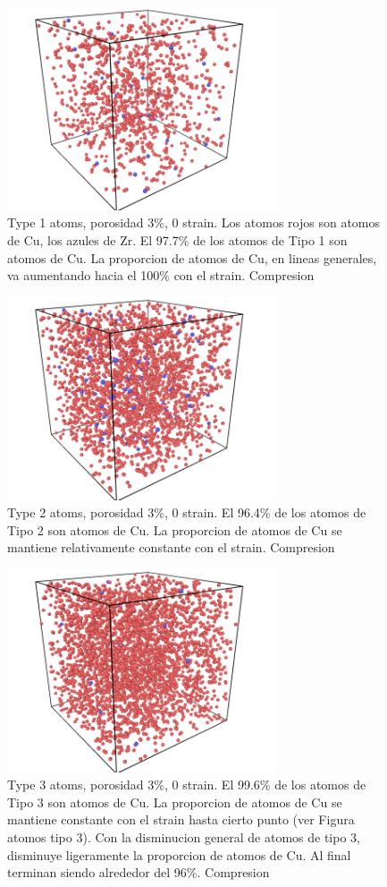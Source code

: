 \documentclass[10pt, oneside]{article} %
\begin{document}
\begin{figure}[H]
\centering
\includegraphics[width=8cm]{Figures/Porosidad/Porosidad_3_CU_tipo1.png}
\caption{Type 1 atoms, porosidad 3\%, 0 strain. Los atomos rojos son atomos de Cu, los azules de Zr. El 97.7\% de los atomos de Tipo 1 son atomos de Cu. La proporcion de atomos de Cu, en lineas generales, va aumentando hacia el 100\% con el strain. Compresion}
\end{figure}

\begin{figure}[H]
\centering
\includegraphics[width=8cm]{Figures/Porosidad/Porosidad_3_CU_tipo2.png}
\caption{Type 2 atoms, porosidad 3\%, 0 strain. El 96.4\% de los atomos de Tipo 2 son atomos de Cu. La proporcion de atomos de Cu se mantiene relativamente constante con el strain. Compresion}
\end{figure}

\begin{figure}[H]
\centering
\includegraphics[width=8cm]{Figures/Porosidad/Porosidad_3_CU_tipo3.png}
\caption{Type 3 atoms, porosidad 3\%, 0 strain. El 99.6\% de los atomos de Tipo 3 son atomos de Cu. La proporcion de atomos de Cu se mantiene constante con el strain hasta cierto punto (ver Figura atomos tipo 3). Con la disminucion general de atomos de tipo 3, disminuye ligeramente la proporcion de atomos de Cu. Al final terminan siendo alrededor del 96\%. Compresion}
\end{figure}
\end{document}
